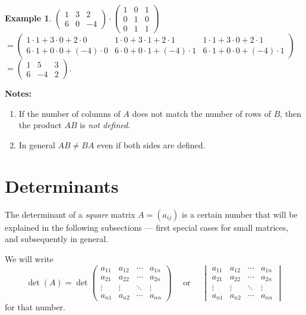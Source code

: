 \documentclass[
  12pt,
  oneside]{book}
\theoremstyle{definition}
\theoremstyle{definition}
\newtheorem{example}{Example}[chapter]
\theoremstyle{definition}
\theoremstyle{definition}
\theoremstyle{remark}
\begin{document}
\begin{example}
\protect\hypertarget{exm:unnamed-chunk-47}{}\label{exm:unnamed-chunk-47}\(\begin{pmatrix}1 & 3 & 2\\ 6 & 0 & -4\end{pmatrix}\cdot \begin{pmatrix}1 & 0 & 1\\ 0&1&0 \\ 0& 1 & 1\end{pmatrix}\)\\
\(=\begin{pmatrix}1\cdot1+3\cdot0+2\cdot0& 1\cdot0+3\cdot1+2\cdot1&1\cdot1+3\cdot0+2\cdot1\\ 6\cdot1+0\cdot0+(-4)\cdot0 & 6\cdot0+0\cdot1+(-4)\cdot1 & 6\cdot1+0\cdot0+(-4)\cdot1\end{pmatrix}\)\\
\(=\begin{pmatrix}1&5&3\\6&-4&2\end{pmatrix}\).
\end{example}

\textbf{Notes:}

\begin{enumerate}
\def\labelenumi{(\roman{enumi})}
\item
  If the number of columns of \(A\) does not match the number of rows of \(B\), then the product \(AB\) is \emph{not defined}.
\item
  In general \(AB\not=BA\) even if both sides are defined.
\end{enumerate}

\section{Determinants}\label{determinants}

The determinant of a \emph{square} matrix \(A=(a_{ij})\) is a certain number that will be explained in the following subsections --- first special cases for small matrices, and subsequently in general.

We will write
\[
\det(A) = \det
\begin{pmatrix}
    a_{11} & a_{12} & \cdots & a_{1n}\\
    a_{21} & a_{22} & \cdots & a_{2n}\\
    \vdots & \vdots & \ddots & \vdots \\
    a_{n1} & a_{n2} & \cdots & a_{nn}
\end{pmatrix}
\quad\text{ or }\quad
\begin{vmatrix}
    a_{11} & a_{12} & \cdots & a_{1n}\\
    a_{21} & a_{22} & \cdots & a_{2n}\\
    \vdots & \vdots & \ddots & \vdots \\
    a_{n1} & a_{n2} & \cdots & a_{nn}
\end{vmatrix}
\]
for that number.
\end{document}
